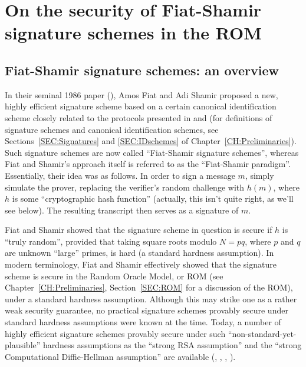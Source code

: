 \chapter{On the security of Fiat-Shamir signature schemes in the ROM}
\label{CH:Fiatshamir}

\section{Fiat-Shamir signature schemes: an overview} 
\label{SEC:Overview}
In their seminal 1986 paper (\cite{fiat:fsparadigm}), Amos Fiat and Adi Shamir
proposed a new, highly efficient signature scheme based on a certain canonical
identification scheme closely related to the protocols presented in
\cite{goldwasser:ips1} and \cite{fischer:obtransfer} (for definitions of
signature schemes and canonical identification schemes, see
Sections~\ref{SEC:Signatures} and \ref{SEC:IDschemes} of
Chapter~\ref{CH:Preliminaries}). Such signature schemes are now called
``Fiat-Shamir signature schemes'', whereas Fiat and Shamir's approach itself
is referred to as the ``Fiat-Shamir paradigm''. Essentially, their idea was as
follows.
In order to sign a message $m$, simply simulate the prover, replacing the
verifier's random challenge with $h(m)$, where $h$ is some ``cryptographic
hash function'' (actually, this isn't quite right, as we'll see below). The
resulting transcript then serves as a signature of $m$.

Fiat and Shamir showed that the signature scheme in question is secure if $h$
is ``truly random'', provided that taking square roots modulo $N = pq$, where
$p$ and $q$ are unknown ``large'' primes, is hard (a standard hardness
assumption). In modern terminology, Fiat and Shamir effectively showed that
the signature scheme is secure in the Random Oracle Model, or ROM (see
Chapter~\ref{CH:Preliminaries}, Section~\ref{SEC:ROM} for a discussion of the
ROM), under a standard hardness assumption. Although this may strike one as a
rather weak security guarantee, no practical signature schemes provably secure
under standard hardness assumptions were known at the time.  Today, a number
of highly efficient signature schemes provably secure under such
``non-standard-yet-plausible'' hardness assumptions as the ``strong RSA
assumption'' and the ``strong Computational Diffie-Hellman assumption'' are
available (\cite{gennaro:fastsigs}, \cite{cramer:signatures2},
\cite{fischlin:cramershoup}, \cite{boneh:shortsigsnorom}). 

